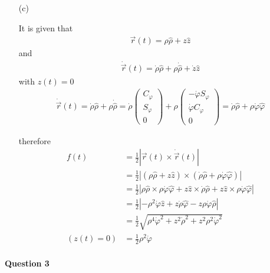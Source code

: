 \documentclass[11pt,a4paper]{article}
\begin{document}
\begin{enumerate}
\newpage

\item[(c)]

It is given that
\begin{align*}
\vec{r}(t)=\rho\hat{\rho}+z\hat{z}
\end{align*}
and
\begin{align*}
\dot{\vec{r}}(t)=\dot{\rho}\hat{\rho}+\rho\dot{\hat{\rho}}+\dot{z}\hat{z}
\end{align*}
with $z(t)=0$
\begin{align*}
\dot{\vec{r}}(t)=\dot{\rho}\hat{\rho}+\rho\dot{\hat{\rho}}
=
\dot{\rho}
\begin{pmatrix}
C_\varphi \\
S_\varphi \\
0
\end{pmatrix}
+\rho
\begin{pmatrix}
-\dot{\varphi}S_\varphi \\
\dot{\varphi}C_\varphi \\
0
\end{pmatrix}=
\dot{\rho}\hat{\rho}+\rho\dot{\varphi}\hat{\varphi}
\end{align*}

therefore
\begin{align*}
f(t)
&=\frac{1}{2}|\vec{r}(t)\times \dot{\vec{r}}(t)| \\
&=\frac{1}{2}|(\rho\hat{\rho}+z\hat{z})\times(\dot{\rho}\hat{\rho}+\rho\dot{\varphi}\hat{\varphi})| \\
&=\frac{1}{2}|\rho\hat{\rho}\times\rho\dot{\varphi}\hat{\varphi}+z\hat{z}\times\dot{\rho}\hat{\rho}+z\hat{z}\times\rho\dot{\varphi}\hat{\varphi}| \\
&=\frac{1}{2}|-\rho^2\dot{\varphi}\hat{z}+z\dot{\rho}\hat{\varphi}-z\rho\dot{\varphi}\hat{\rho}| \\
&=\frac{1}{2}\sqrt{\rho^4\dot{\varphi}^2+z^2\dot{\rho}^2+z^2\rho^2\dot{\varphi}^2} \\
(z(t)=0)
&=\frac{1}{2}\rho^2\dot{\varphi}
\end{align*}

\end{enumerate}

\newpage

\paragraph{Question 3}
\end{document}

